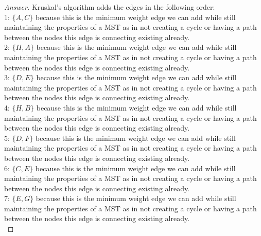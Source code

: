 \documentclass[11pt]{article}
\theoremstyle{definition}
\theoremstyle{definition}
\theoremstyle{definition}
\begin{document}
\begin{proof}[Answer]
Kruskal's algorithm adds the edges in the following order:\\
1: $\{A, C\}$ because this is the minimum weight edge we can add while still maintaining the properties of a MST as in not creating a cycle or having a path between the nodes this edge is connecting existing already.\\
2: $\{H, A\}$ because this is the minimum weight edge we can add while still maintaining the properties of a MST as in not creating a cycle or having a path between the nodes this edge is connecting existing already.\\
3: $\{D, E\}$ because this is the minimum weight edge we can add while still maintaining the properties of a MST as in not creating a cycle or having a path between the nodes this edge is connecting existing already.\\
4: $\{H, B\}$ because this is the minimum weight edge we can add while still maintaining the properties of a MST as in not creating a cycle or having a path between the nodes this edge is connecting existing already.\\
5: $\{D, F\}$ because this is the minimum weight edge we can add while still maintaining the properties of a MST as in not creating a cycle or having a path between the nodes this edge is connecting existing already.\\
6: $\{C, E\}$ because this is the minimum weight edge we can add while still maintaining the properties of a MST as in not creating a cycle or having a path between the nodes this edge is connecting existing already.\\
7: $\{E, G\}$ because this is the minimum weight edge we can add while still maintaining the properties of a MST as in not creating a cycle or having a path between the nodes this edge is connecting existing already.\\
\end{proof}




\end{document}
